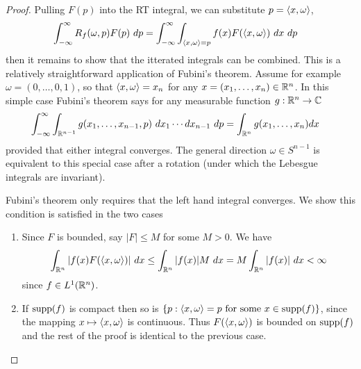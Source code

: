 \begin{proof}
  Pulling $F(p)$ into the RT integral, we can substitute $p = \left\langle x, \omega \right\rangle$,
  \begin{align*}
    \int_{-\infty}^\infty R_f(\omega, p) F(p) ~dp
    &= \int_{-\infty}^\infty \int_{\left\langle x, \omega \right\rangle = p} f(x) F(\left\langle x, \omega \right\rangle) ~dx ~dp
  \end{align*}
  then it remains to show that the itterated integrals can be combined. This is a relatively straightforward application of Fubini's theorem. Assume for example $\omega = (0, \ldots, 0, 1)$, so that $\left\langle x, \omega \right\rangle = x_n$ for any $x = (x_1, \ldots, x_n) \in \mathbb{R}^n$. In this simple case Fubini's theorem says for any measurable function $g : \mathbb{R}^n \to \mathbb{C}$ 
  \begin{align*}
    \int_{-\infty}^\infty \int_{\mathbb{R}^{n - 1}} g(x_1, \ldots, x_{n - 1}, p) ~dx_1 \cdots dx_{n - 1} ~dp
    &= \int_{\mathbb{R}^n} g(x_1, \ldots, x_n) dx
  \end{align*}
  provided that either integral converges. The general direction $\omega \in S^{n-1}$ is equivalent to this special case after a rotation (under which the Lebesgue integrals are invariant).

  Fubini's theorem only requires that the left hand integral converges. We show this condition is satisfied in the two cases
  \begin{enumerate}
    \item Since $F$ is bounded, say $|F| \leq M$ for some $M > 0$. We have
  \[
    \int_{\mathbb{R}^n} |f(x) F(\left\langle x, \omega \right\rangle)| ~dx 
    \leq \int_{\mathbb{R}^n} |f(x)| M ~dx 
    = M \int_{\mathbb{R}^n} |f(x)| ~dx < \infty
  \]
  since $f \in L^1(\mathbb{R}^n)$.
  \item If $\text{supp}(f)$ is compact then so is $\{p : \left\langle x, \omega \right\rangle = p \text{ for some } x \in \text{supp}(f)\}$, since the mapping $x \mapsto \left\langle x, \omega \right\rangle$ is continuous. Thus $F(\left\langle x, \omega \right\rangle)$ is bounded on $\text{supp}(f)$ and the rest of the proof is identical to the previous case.
  \end{enumerate}
  


\end{proof}
